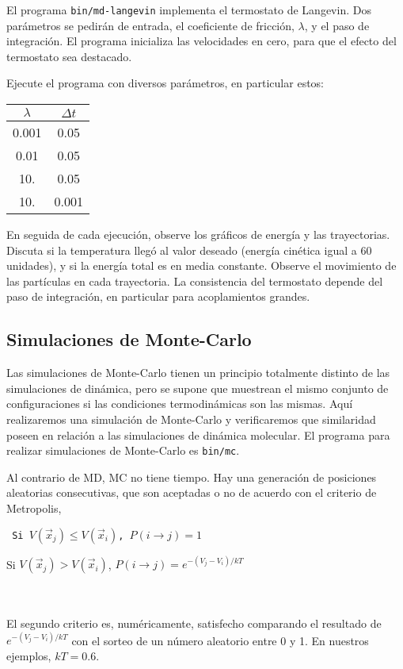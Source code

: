 \documentclass[10pt,a4paper,ssfamily]{exam}
\newcommand{\1}{{\bf 1}}
\newcommand{\2}{{\bf 2}}
\newcommand{\3}{{\bf 3}}
\begin{document}
El programa {\tt bin/md-langevin} implementa el termostato de Langevin.
Dos parámetros se pedirán de entrada, el coeficiente de fricción,
$\lambda$, y el paso de integración. El programa inicializa las velocidades
en cero, para que el efecto del termostato sea destacado.

Ejecute el programa con diversos parámetros, en particular estos:

{\tt \begin{center}\begin{tabular}{cc}
\hline
 $\lambda$ & $\Delta t$ \\
\hline
0.001 & 0.05 \\
0.01  & 0.05 \\
10.   & 0.05 \\
10.   & 0.001 \\
\hline
\end{tabular}\end{center}}

En seguida de cada ejecución, observe los gráficos de energía y las
trayectorias. Discuta si la temperatura llegó al valor deseado (energía
cinética igual a 60 unidades), y si la energía total es en media
constante. Observe el movimiento de las partículas en cada trayectoria. 
La consistencia del termostato depende del paso de integración, en
particular para acoplamientos grandes.  

\subsection{Simulaciones de Monte-Carlo}

Las simulaciones de Monte-Carlo tienen un principio totalmente distinto
de las simulaciones de dinámica, pero se supone que muestrean el mismo
conjunto de configuraciones si las condiciones termodinámicas son las
mismas. Aquí realizaremos una simulación de Monte-Carlo y verificaremos
que similaridad poseen en relación a las simulaciones de dinámica
molecular. El programa para realizar simulaciones de Monte-Carlo es 
{\tt bin/mc}.

Al contrario de MD, MC no tiene tiempo. Hay una generación de posiciones
aleatorias consecutivas, que son aceptadas o no de acuerdo con el
criterio de Metropolis,\\

{\tt 
\hspace{3cm} Si $V(\vec{x}_j) \leqslant V(\vec{x}_i)$, $P(i\to j) = 1$ 

\hspace{3cm} Si $V(\vec{x}_j) > V(\vec{x}_i)$, $P(i\to j) = e^{-(V_j-V_i)/kT}$
}\\\\
El segundo criterio es, numéricamente, satisfecho comparando el
resultado de $e^{-(V_j-V_i)/kT}$ con el sorteo de un número aleatorio
entre 0 y 1. En nuestros ejemplos, $kT=0.6$.
\end{document}
